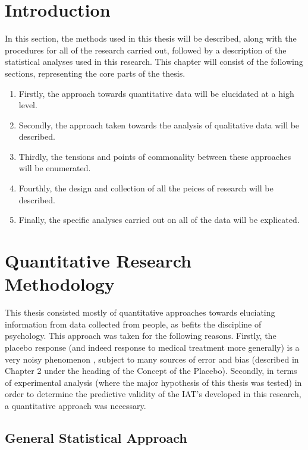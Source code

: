 
\section{Introduction}

In this section, the methods used in this thesis will be described, along with the procedures for all of the research carried out, followed by a description of the statistical analyses used in this research. This chapter will consist of the following sections, representing the core parts of the thesis.

\begin{enumerate}
\item Firstly, the approach towards quantitative data will be elucidated at a high level.
\item Secondly, the approach taken towards the analysis of qualitative data will be described.
\item Thirdly, the tensions and points of commonality between these approaches will be enumerated.
\item Fourthly, the design and collection of all the peices of  research will be described.
\item Finally, the specific analyses carried out on all of the data will be explicated. 
\end{enumerate}

\section{Quantitative Research Methodology}

This thesis consisted mostly of quantitative approaches towards eluciating information from data collected from people, as befits the discipline of psychology. This approach was taken for the following reasons. Firstly, the placebo response (and indeed response to medical treatment more generally) is a very noisy phenomenon \cite{Singer2005}, subject to many sources of error and bias (described in Chapter 2 under the heading of the Concept of the Placebo). Secondly, in terms of experimental analysis (where the major hypothesis of this thesis was tested) in order to determine the predictive validity of the IAT's developed in this research, a quantitative approach was necessary. 

\subsection{General Statistical Approach}

